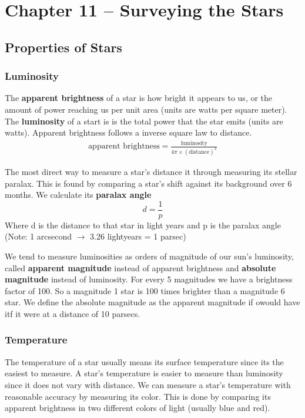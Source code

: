 \section{Chapter 11 -- Surveying the Stars}
\subsection{Properties of Stars}
\subsubsection{Luminosity}
The \textbf{apparent brightness} of a star is how bright it appears to us, or the amount of power reaching us per unit area (units are watts per square meter). The \textbf{luminosity} of a start is is the total power that the star emits (units are watts). Apparent brightness follows a inverse square law to distance.
\begin{align*}
    \text{apparent brightness} = \frac{\text{luminosity}}{4\pi \times (\text{distance})^2}
\end{align*}

The most direct way to measure a star's distance it through measuring its stellar paralax. This is found by comparing a star's shift against its background over 6 months. We calculate its \textbf{paralax angle} \[ d = \frac{1}{p} \]
Where d is the distance to that star in light years and p is the paralax angle (Note: 1 arcsecond $\rightarrow$ 3.26 lightyears = 1 parsec)

We tend to measure luminosities as orders of magnitude of our sun's luminosity, called \textbf{apparent magnitude} instead of apparent brightness and \textbf{absolute magnitude} instead of luminosity. For every 5 magnitudes we have a brightness factor of 100. So a magnitude 1 star is 100 times brighter than a magnitude 6 star. We define the absolute magnitude as the apparent magnitude if owould have itf it were at a distance of 10 parsecs.

\subsubsection{Temperature}
The temperature of a star usually means its surface temperature since its the easiest to measure. A star's temperature is easier to measure than luminosity since it does not vary with distance. We can measure a star's temperature with reasonable accuracy by measuring its color. This is done by comparing its apparent brightness in two different colors of light (usually blue and red).

